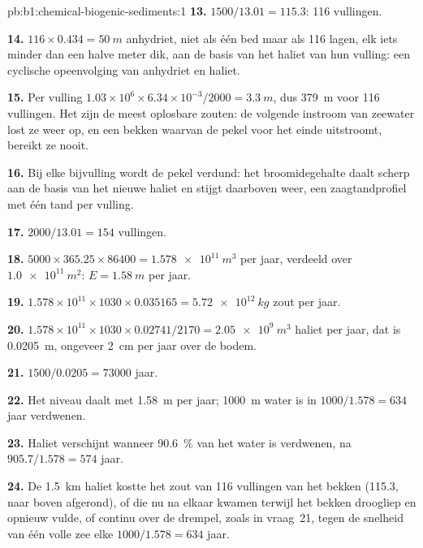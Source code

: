 \begin{solution}{pb:b1:chemical-biogenic-sediments:1}
\textbf{13.} $1500/13.01 = 115.3$: 116 vullingen.

\textbf{14.} $116\times0.434 = \qty{50}{m}$ anhydriet, niet als één bed maar als
116 lagen, elk iets minder dan een halve meter dik, aan de basis van het haliet van
hun vulling: een cyclische opeenvolging van anhydriet en haliet.

\textbf{15.} Per vulling $1.03\times10^6\times6.34\times10^{-3}/2000 =
\qty{3.3}{m}$, dus \qty{379}{m} voor 116 vullingen. Het zijn de meest oplosbare
zouten: de volgende instroom van zeewater lost ze weer op, en een bekken waarvan de pekel
voor het einde uitstroomt, bereikt ze nooit.

\textbf{16.} Bij elke bijvulling wordt de pekel verdund: het broomidegehalte daalt
scherp aan de basis van het nieuwe haliet en stijgt daarboven weer, een zaagtandprofiel
met één tand per vulling.

\textbf{17.} $2000/13.01 = 154$ vullingen.

\textbf{18.} $5000\times365.25\times86400 = \qty{1.578e11}{m^3}$ per jaar, verdeeld
over $\qty{1.0e11}{m^2}$: $E = \qty{1.58}{m}$ per jaar.

\textbf{19.} $1.578\times10^{11}\times1030\times0.035165 = \qty{5.72e12}{kg}$ zout
per jaar.

\textbf{20.} $1.578\times10^{11}\times1030\times0.02741/2170 =
\qty{2.05e9}{m^3}$ haliet per jaar, dat is \qty{0.0205}{m}, ongeveer \qty{2}{cm}
per jaar over de bodem.

\textbf{21.} $1500/0.0205 = \num{73000}$ jaar.

\textbf{22.} Het niveau daalt met \qty{1.58}{m} per jaar; \qty{1000}{m} water is
in $1000/1.578 = 634$ jaar verdwenen.

\textbf{23.} Haliet verschijnt wanneer \qty{90.6}{\%} van het water is verdwenen, na
$905.7/1.578 = 574$ jaar.

\textbf{24.} De \qty{1.5}{km} haliet kostte het zout van 116 vullingen van het
bekken (115.3, naar boven afgerond), of die nu na elkaar kwamen terwijl het bekken
droogliep en opnieuw vulde, of continu over de drempel, zoals in
vraag~21, tegen de snelheid van één volle zee elke
$1000/1.578 = 634$ jaar.
\end{solution}
